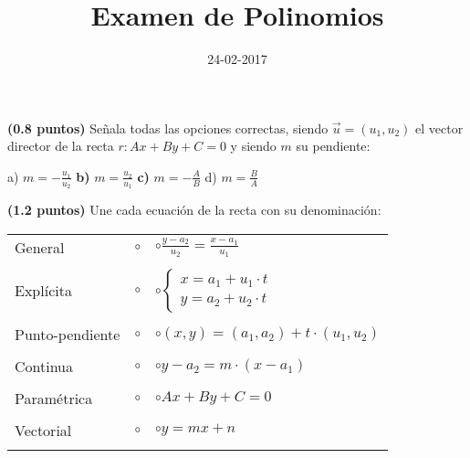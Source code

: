 \documentclass[palatino,noprobframes]{CuartillaSafa}
\title{Examen de Polinomios}
\date{24-02-2017}
\renewcommand{\vec}[1]{\overrightarrow{#1}}
\begin{document}
\cabecera
\pagestyle{fancy}

\begin{problem}\textbf{(0.8 puntos)}
Señala todas las opciones correctas, siendo $\vec{u} = (u_1,u_2)$ el vector director de la recta $r: Ax+By+C = 0$ y siendo $m$ su pendiente:

a) $\displaystyle m=-\frac{u_1}{u_2}$\;\;\;\;\;\;\;\;\;
\textbf{b)} $\displaystyle m=\frac{u_2}{u_1}$\;\;\;\;\;\;\;\;\;
\textbf{c)} $\displaystyle m=-\frac{A}{B}$\;\;\;\;\;\;\;\;\;
d) $\displaystyle m=\frac{B}{A}$\;\;\;\;\;\;\;\;\;
\end{problem}


\begin{problem}\textbf{(1.2 puntos)} 
Une cada ecuación de la recta con su denominación:

\begin{tabular}{L{2.25cm}L{3cm}L{8cm}}
General 		&$\circ$&$\circ$\;\;$\displaystyle\frac{y-a_2}{u_2} = \frac{x-a_1}{u_1}$ \\\\
Explícita 		&$\circ$&$\circ$\;\;$\left\{\begin{array}{c} x=a_1+u_1·t\\y=a_2+u_2·t\end{array}\right.$ \\\\
Punto-pendiente &$\circ$&$\circ$\;\;$(x,y) = (a_1,a_2) + t·(u_1,u_2)$ \\\\
Continua 		&$\circ$&$\circ$\;\;$y-a_2 = m·(x-a_1)$ \\\\
Paramétrica 	&$\circ$&$\circ$\;\;$Ax+By+C=0$ \\\\
Vectorial 		&$\circ$&$\circ$\;\;$y=mx+n$ \\\\
\end{tabular}
\end{problem}
\vspace{-0.7cm}
\end{document}
